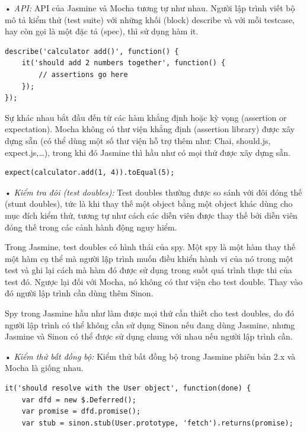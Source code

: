 \documentclass[12pt,a4paper]{article}
\begin{document}
\begin{list}{}{}
\item[•] \emph{API:} 
API của Jasmine và Mocha tương tự như nhau. Người lập trình viết bộ mô tả kiểm thử (test suite) với những khối (block) describe và với mỗi testcase, hay còn gọi là một đặc tả (spec), thì sử dụng hàm it.

\begin{lstlisting}[caption=Cấu trúc của một test-suite trong Jasmine,label={code:jasmine_1}]
describe('calculator add()', function() {
	it('should add 2 numbers together', function() {
		// assertions go here
	});
});
\end{lstlisting}

Sự khác nhau bắt đầu đến từ các hàm khẳng định hoặc kỳ vọng (assertion or expectation). Mocha không có thư viện khẳng định (assertion library) được xây dựng sẵn (có thể dùng một số thư viện hỗ trợ thêm như: Chai, should.js, expect.js,…), trong khi đó Jasmine thì hầu như có mọi thứ được xây dựng sẵn.

\begin{lstlisting}[caption=Ví dụ sử dụng expect trong Jasmine,label={code:jasmine_2}]
expect(calculator.add(1, 4)).toEqual(5);
\end{lstlisting}

\item[•] \emph{Kiểm tra đôi (test doubles):}
Test doubles thường được so sánh với đôi đóng thế (stunt doubles), tức là khi thay thế một object bằng một object khác dùng cho mục đích kiểm thử, tương tự như cách các diễn viên được thay thế bởi diễn viên đóng thế trong các cảnh hành động nguy hiểm.

Trong Jasmine, test doubles có hình thái của spy. Một spy là một hàm thay thế một hàm cụ thể mà người lập trình muốn điều khiển hành vi của nó trong một test và ghi lại cách mà hàm đó được sử dụng trong suốt quá trình thực thi của test đó.
Ngược lại đối với Mocha, nó không có thư viện cho test double. Thay vào đó người lập trình cần dùng thêm Sinon.

Spy trong Jasmine hầu như làm được mọi thứ cần thiết cho test doubles, do đó người lập trình có thể không cần sử dụng Sinon nếu đang dùng Jasmine, nhưng Jasmine và Sinon có thể được sử dụng chung với nhau nếu người lập trình cần.

\item[•] \emph{Kiểm thử bất đồng bộ:}
Kiểm thử bất đồng bộ trong Jasmine phiên bản 2.x và Mocha là giống nhau.

\begin{lstlisting}[caption=Ví dụ sử dụng Jasmine để kiểm thử bất đồng bộ,label={code:jasmine_3}]
it('should resolve with the User object', function(done) {
	var dfd = new $.Deferred();
	var promise = dfd.promise();
	var stub = sinon.stub(User.prototype, 'fetch').returns(promise);
	

\end{lstlisting}
\end{list}
\end{document}
